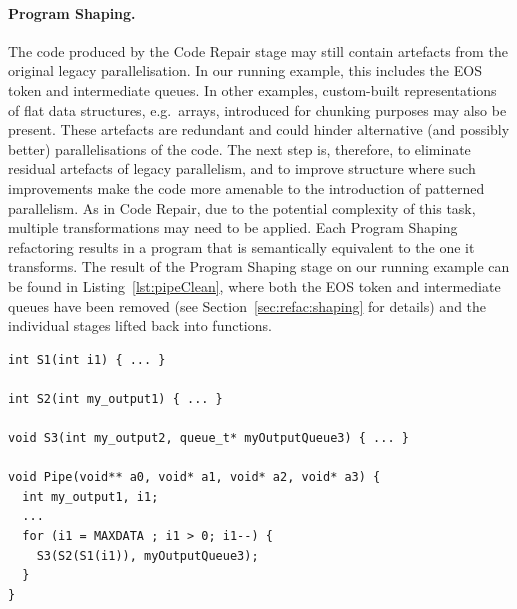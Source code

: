 \paragraph{Program Shaping.}
The code produced by the Code Repair stage may still contain artefacts from the original legacy parallelisation. In our running example, this includes the EOS token and intermediate queues.
%
In other examples, custom-built representations of flat data structures, e.g.\ arrays, introduced for chunking purposes may also be present.
%
These artefacts are redundant and could hinder alternative (and possibly better) parallelisations of the code. The next step is, therefore, to eliminate residual artefacts of legacy parallelism, and to improve structure where such improvements make the code more amenable to the introduction of patterned parallelism.
%
As in Code Repair, due to the potential complexity of this task, multiple transformations may need to be applied.
%
Each Program Shaping refactoring results in a program that is semantically equivalent to the one it transforms.
%
The result of the Program Shaping stage on our running example can be found in Listing~\ref{lst:pipeClean}, where both the EOS token and intermediate queues have been removed (see Section~\ref{sec:refac:shaping} for details) and the individual stages lifted back into functions.


\begin{lstlisting}[caption=Clean Sequential Simple Pipeline Code, label=lst:pipeClean]
int S1(int i1) { ... }

int S2(int my_output1) { ... }

void S3(int my_output2, queue_t* myOutputQueue3) { ... }

void Pipe(void** a0, void* a1, void* a2, void* a3) {
  int my_output1, i1;
  ...
  for (i1 = MAXDATA ; i1 > 0; i1--) {
    S3(S2(S1(i1)), myOutputQueue3);
  }
}
\end{lstlisting}

